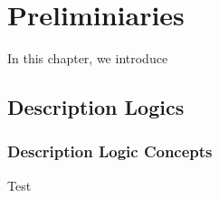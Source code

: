 
\chapter{Preliminiaries}
\label{cha:preliminiaries}

In this chapter, we introduce 


\section{Description Logics}
\label{sec:description-logics}

\subsection{Description Logic Concepts}
\label{sec:dl-concepts}

\begin{definition}
  Test
\end{definition}

